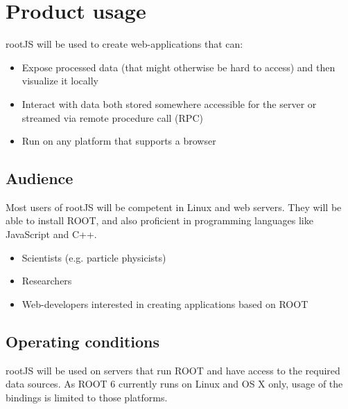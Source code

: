 \chapter{Product usage}

rootJS will be used to create web-applications that can:
\begin{itemize}
	\item Expose processed data (that might otherwise be hard to access) and then visualize it locally
	\item Interact with data both stored somewhere accessible for the server or streamed via remote procedure call (RPC)
	\item Run on any platform that supports a browser
\end{itemize}


\section{Audience}
Most users of rootJS will be competent in Linux and web servers. They will be able to install ROOT, and also proficient in programming languages like JavaScript and C++.
\begin{itemize}
	\item Scientists (e.g. particle physicists)
	\item Researchers
	\item Web-developers interested in creating applications based on ROOT
\end{itemize}

\section{Operating conditions}

rootJS will be used on servers that run ROOT and have access to the required data sources. As ROOT 6 currently runs on Linux and OS X only, usage of the bindings is limited to those platforms.
